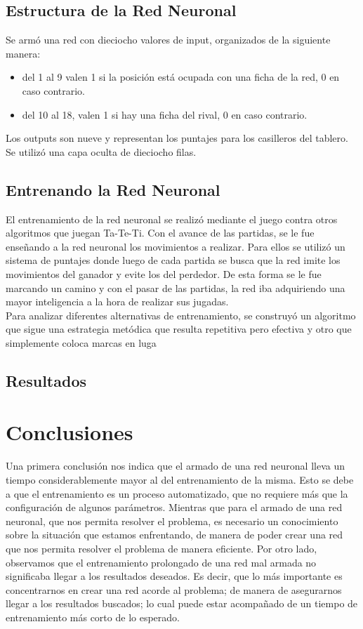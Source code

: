 \documentclass[12pt,titlepage]{article}
\begin{document}
\subsection{Estructura de la Red Neuronal}
Se arm\'o una red con dieciocho valores de input, organizados de la siguiente manera:
\begin{itemize}
 \item del 1 al 9 valen 1 si la posición está ocupada con una ficha de la red, 0 en caso contrario.
 \item del 10 al 18, valen 1 si hay una ficha del rival, 0 en caso contrario.
\end{itemize}
Los outputs son nueve y representan los puntajes para los casilleros del tablero. Se utiliz\'o una capa oculta de dieciocho filas. 

\subsection{Entrenando la Red Neuronal}
El entrenamiento de la red neuronal se realiz\'o mediante el juego contra otros algoritmos que juegan Ta-Te-Ti. Con el avance de las partidas, se le fue ense\~nando a la red neuronal los movimientos a realizar. Para ellos se utiliz\'o un sistema de puntajes donde luego de cada partida se busca que la red imite los movimientos del ganador y evite los del perdedor. De esta forma se le fue marcando un camino y con el pasar de las partidas, la red iba adquiriendo una mayor inteligencia a la hora de realizar sus jugadas. \\ 

Para analizar diferentes alternativas de entrenamiento, se construy\'o un algoritmo que sigue una estrategia met\'odica que resulta repetitiva pero efectiva y otro que simplemente coloca marcas en luga%

\subsection{Resultados}

\pagebreak
\section{Conclusiones}
Una primera conclusi\'on nos indica que el armado de una red neuronal lleva un tiempo considerablemente mayor al del entrenamiento de la misma. Esto se debe a que el entrenamiento es un proceso automatizado, que no requiere m\'as que la conﬁguraci\'on de algunos par\'ametros. Mientras que para el armado de una red neuronal, que nos permita resolver el problema, es necesario un conocimiento sobre la situaci\'on que
estamos enfrentando, de manera de poder crear una red que nos permita resolver el problema de manera eﬁciente. Por otro lado, observamos que el entrenamiento prolongado de una red mal armada no signiﬁcaba llegar a los resultados deseados. Es decir, que lo m\'as importante es concentrarnos en crear una red acorde al problema; de manera de asegurarnos llegar a los resultados buscados; lo cual puede estar acompa\~nado de un tiempo de entrenamiento m\'as corto de lo esperado. \\
\end{document}

